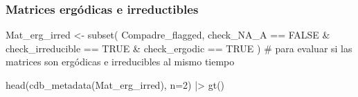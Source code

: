 \documentclass[
  12pt,
  letterpaper,
]{book}
\newenvironment{Shaded}{\begin{snugshade}}{\end{snugshade}}
\newcommand{\AttributeTok}[1]{\textcolor[rgb]{0.40,0.45,0.13}{#1}}
\newcommand{\CommentTok}[1]{\textcolor[rgb]{0.37,0.37,0.37}{#1}}
\newcommand{\ConstantTok}[1]{\textcolor[rgb]{0.56,0.35,0.01}{#1}}
\newcommand{\DecValTok}[1]{\textcolor[rgb]{0.68,0.00,0.00}{#1}}
\newcommand{\FunctionTok}[1]{\textcolor[rgb]{0.28,0.35,0.67}{#1}}
\newcommand{\NormalTok}[1]{\textcolor[rgb]{0.00,0.23,0.31}{#1}}
\newcommand{\OtherTok}[1]{\textcolor[rgb]{0.00,0.23,0.31}{#1}}
\newcommand{\SpecialCharTok}[1]{\textcolor[rgb]{0.37,0.37,0.37}{#1}}
\begin{document}
\begin{table}
\begin{tabular*}{\linewidth}{@{\extracolsep{\fill}}rlllllllllllllllllllrllrrrrllllrrrrllllllllrlrrlrllllrrlllcccccccccccccc}
\bottomrule
\end{tabular*}
\end{table}

\subsubsection{Matrices ergódicas e
irreductibles}\label{matrices-erguxf3dicas-e-irreductibles}

\begin{Shaded}
\begin{Highlighting}[]
\NormalTok{Mat\_erg\_irred }\OtherTok{\textless{}{-}} \FunctionTok{subset}\NormalTok{(}
\NormalTok{  Compadre\_flagged,}
\NormalTok{  check\_NA\_A }\SpecialCharTok{==} \ConstantTok{FALSE} \SpecialCharTok{\&}\NormalTok{ check\_irreducible }\SpecialCharTok{==} \ConstantTok{TRUE} \SpecialCharTok{\&}\NormalTok{ check\_ergodic }\SpecialCharTok{==} \ConstantTok{TRUE}
\NormalTok{) }\CommentTok{\# para evaluar si las matrices son ergódicas e irreducibles al mismo tiempo}

\FunctionTok{head}\NormalTok{(}\FunctionTok{cdb\_metadata}\NormalTok{(Mat\_erg\_irred), }\AttributeTok{n=}\DecValTok{2}\NormalTok{) }\SpecialCharTok{|\textgreater{}} 
  \FunctionTok{gt}\NormalTok{()}
\end{Highlighting}
\end{Shaded}
\end{document}
